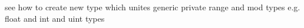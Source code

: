 

see how to create new type which unites generic private range and mod
types e.g. float and int and uint types

